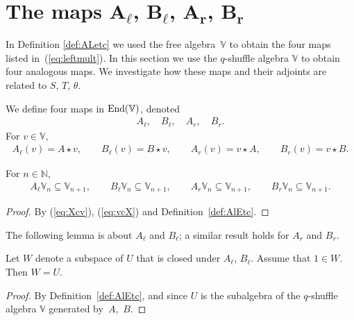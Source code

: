 \section[The maps $A_{\ell}$, $B_{\ell}$, $A_{r}$, $B_{r}$]{The maps $\boldsymbol{A_{\ell}}$, $\boldsymbol{B_{\ell}}$, $\boldsymbol{A_{r}}$, $\boldsymbol{B_{r}}$}\label{section7}

In Definition \ref{def:ALetc} we used the free algebra~$\mathbb V$ to obtain the four maps listed in~(\ref{eq:leftmult}). In this section we use the $q$-shuffle algebra $\mathbb V$ to obtain
four analogous maps. We investigate how these maps and their adjoints are related to $S$, $T$, $\theta$.

\begin{Definition}\label{def:AlEtc}We define four maps in ${\rm End}(\mathbb V)$, denoted
\begin{gather}\label{eq:alblarbr}
A_{\ell}, \quad
B_{\ell}, \quad
A_{r}, \quad
B_{r}.
\end{gather}
For $v \in \mathbb V$,
\begin{gather*}
A_{\ell}(v) = A\star v, \qquad
B_{\ell}(v) = B\star v, \qquad
A_{r}(v) = v \star A, \qquad
B_{r}(v) = v \star B.
\end{gather*}
\end{Definition}

\begin{Lemma}\label{lem:ABlRaise2} For $n \in \mathbb N$,
\begin{gather*}
A_{\ell} \mathbb V_n \subseteq \mathbb V_{n+1},
\qquad
B_{\ell} \mathbb V_n \subseteq \mathbb V_{n+1},
\qquad
A_{r} \mathbb V_n \subseteq \mathbb V_{n+1},
\qquad
B_{r} \mathbb V_n \subseteq \mathbb V_{n+1}.
\end{gather*}
\end{Lemma}
\begin{proof} By (\ref{eq:Xcv}), (\ref{eq:vcX}) and Definition~\ref{def:AlEtc}.
\end{proof}

The following lemma is about $A_\ell$ and $B_{\ell}$; a similar result holds for
 $A_r$ and $B_r$.
\begin{Lemma}\label{lem:ABirred2} Let $W$ denote a subspace of $U$ that is closed under $A_\ell$, $B_{\ell}$. Assume that $1 \in W$. Then $W=U$.
\end{Lemma}
\begin{proof} By Definition~\ref{def:AlEtc}, and since $U$ is the subalgebra of the $q$-shuffle algebra $\mathbb V$ generated by~$A$,~$B$.
\end{proof}

